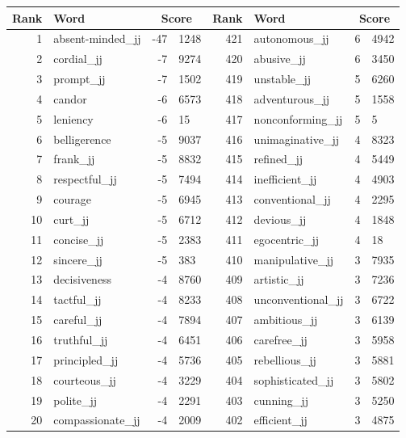 \begin{table}[tbp]
    \begin{tabular}{| rlr@{.}l | rlr@{.}l |}
    \hline
    \textbf{Rank} & \textbf{Word} & \multicolumn{2}{c|}{\textbf{Score}} & \textbf{Rank} & \textbf{Word} & \multicolumn{2}{c|}{\textbf{Score}} \\
    \hline
    1 & absent-minded\_jj & -47 & 1248    &    421 & autonomous\_jj & 6 & 4942 \\
    2 & cordial\_jj & -7 & 9274    &    420 & abusive\_jj & 6 & 3450 \\
    3 & prompt\_jj & -7 & 1502    &    419 & unstable\_jj & 5 & 6260 \\
    4 & candor & -6 & 6573    &    418 & adventurous\_jj & 5 & 1558 \\
    5 & leniency & -6 & 15    &    417 & nonconforming\_jj & 5 & 5 \\
    6 & belligerence & -5 & 9037    &    416 & unimaginative\_jj & 4 & 8323 \\
    7 & frank\_jj & -5 & 8832    &    415 & refined\_jj & 4 & 5449 \\
    8 & respectful\_jj & -5 & 7494    &    414 & inefficient\_jj & 4 & 4903 \\
    9 & courage & -5 & 6945    &    413 & conventional\_jj & 4 & 2295 \\
    10 & curt\_jj & -5 & 6712    &    412 & devious\_jj & 4 & 1848 \\
    11 & concise\_jj & -5 & 2383    &    411 & egocentric\_jj & 4 & 18 \\
    12 & sincere\_jj & -5 & 383    &    410 & manipulative\_jj & 3 & 7935 \\
    13 & decisiveness & -4 & 8760    &    409 & artistic\_jj & 3 & 7236 \\
    14 & tactful\_jj & -4 & 8233    &    408 & unconventional\_jj & 3 & 6722 \\
    15 & careful\_jj & -4 & 7894    &    407 & ambitious\_jj & 3 & 6139 \\
    16 & truthful\_jj & -4 & 6451    &    406 & carefree\_jj & 3 & 5958 \\
    17 & principled\_jj & -4 & 5736    &    405 & rebellious\_jj & 3 & 5881 \\
    18 & courteous\_jj & -4 & 3229    &    404 & sophisticated\_jj & 3 & 5802 \\
    19 & polite\_jj & -4 & 2291    &    403 & cunning\_jj & 3 & 5250 \\
    20 & compassionate\_jj & -4 & 2009    &    402 & efficient\_jj & 3 & 4875 \\

\end{tabular}
\end{table}
